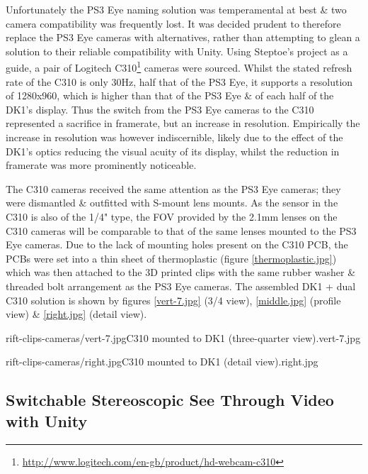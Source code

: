 Unfortunately the PS3 Eye naming solution was temperamental at best \& two camera compatibility was frequently lost. It was decided prudent to therefore replace the PS3 Eye cameras with alternatives, rather than attempting to glean a solution to their reliable compatibility with Unity. Using Steptoe's project as a guide, a pair of Logitech C310\footnote{\url{http://www.logitech.com/en-gb/product/hd-webcam-c310}} cameras were sourced. Whilst the stated refresh rate of the C310 is only 30Hz, half that of the PS3 Eye, it supports a resolution of 1280x960, which is higher than that of the PS3 Eye \& of each half of the DK1's display. Thus the switch from the PS3 Eye cameras to the C310 represented a sacrifice in framerate, but an increase in resolution. Empirically the increase in resolution was however indiscernible, likely due to the effect of the DK1's optics reducing the visual acuity of its display, whilst the reduction in framerate was more prominently noticeable.

The C310 cameras received the same attention as the PS3 Eye cameras; they were dismantled \& outfitted with S-mount lens mounts. As the sensor in the C310 is also of the 1/4" type, the FOV provided by the 2.1mm lenses on the C310 cameras will be comparable to that of the same lenses mounted to the PS3 Eye cameras. Due to the lack of mounting holes present on the C310 PCB, the PCBs were set into a thin sheet of thermoplastic (figure \ref{thermoplastic.jpg}) which was then attached to the 3D printed clips with the same rubber washer \& threaded bolt arrangement as the PS3 Eye cameras. The assembled DK1 + dual C310 solution is shown by figures \ref{vert-7.jpg} (3/4 view), \ref{middle.jpg} (profile view) \& \ref{right.jpg} (detail view).

       {rift-clips-cameras/vert-7.jpg}{C310 mounted to DK1 (three-quarter view).}{vert-7.jpg}

       {rift-clips-cameras/right.jpg}{C310 mounted to DK1 (detail view).}{right.jpg}

\clearpage


\subsection{Switchable Stereoscopic See Through Video with Unity}

